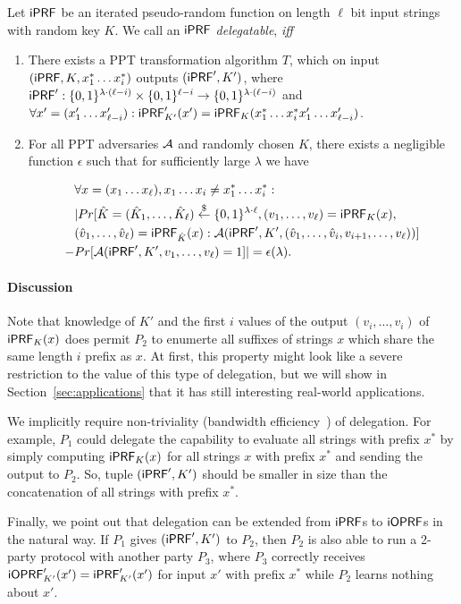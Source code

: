 \begin{definition} \label{def:del}
  Let $\mathsf{i}\mathsf{PRF}$ be an iterated pseudo-random function on length $\ell$
  bit input strings with random key $K$.  We call an $\mathsf{i}\mathsf{PRF}$
  \emph{delegatable}, \emph{iff}
  \begin{enumerate}
    \item
  There exists a PPT transformation
  algorithm $T$, which on input $(\mathsf{i}\mathsf{PRF},K,x^*_1\ldots{}x^*_i)$ outputs
  $(\mathsf{i}\mathsf{PRF}',K')$, where
  $\mathsf{i}\mathsf{PRF}':\{0,1\}^{\lambda\cdot(\ell-i)}\times\{0,1\}^{\ell-i}\rightarrow{}\{0,1\}^{\lambda\cdot(\ell-i)}$
  and
    $\forall{}x'=(x'_1\ldots{}x'_{\ell-i}):\mathsf{i}\mathsf{PRF}'_{K'}(x')=\mathsf{i}\mathsf{PRF}_{K}(x^*_1\ldots{}x^*_ix'_1\ldots{}x'_{\ell-i})$.
  \item For all PPT adversaries ${\mathcal{A}}$ and randomly chosen $K$,
    there exists a negligible function $\epsilon$ such that for
    sufficiently large $\lambda$ we have

    \begin{align*}
      &\forall{}x=(x_1\ldots{}x_\ell),x_1\ldots{}x_i\neq{}x^*_1\ldots{}x^*_i:\\&|Pr[\hat{K}=(\hat{K}_1,\ldots,\hat{K}_\ell)\stackrel{\$}{\leftarrow}\{0,1\}^{\lambda\cdot\ell},(v_1,\ldots,v_\ell)=\mathsf{i}\mathsf{PRF}_K(x),\\&(\hat{v}_1,\ldots,\hat{v}_\ell)=\mathsf{i}\mathsf{PRF}_{\hat{K}}(x):{\mathcal{A}}(\mathsf{i}\mathsf{PRF}',K',(\hat{v}_1,\ldots,\hat{v}_i,v_{i+1},\ldots,v_\ell))]\\-&Pr[{\mathcal{A}}(\mathsf{i}\mathsf{PRF}',K',v_1,\ldots,v_\ell)=1]|=\epsilon(\lambda).
\end{align*}
    \end{enumerate}
  \end{definition}

\paragraph{Discussion}

Note that knowledge of $K'$ and the first $i$ values of the output
$(v_i,\ldots,v_i)$ of $\mathsf{i}\mathsf{PRF}_K(x)$ does permit $P_2$ to enumerte all
suffixes of strings $x$ which share the same length $i$ prefix as
$x$. At first, this property might look like a severe restriction to
the value of this type of delegation, but we will show in
Section~\ref{sec:applications} that it has still interesting
real-world applications.

We implicitly require non-triviality (bandwidth
efficiency~\cite{delegate}) of delegation. For example, $P_1$ could
delegate the capability to evaluate all strings with prefix $x^*$ by
simply computing $\mathsf{i}\mathsf{PRF}_K(x)$ for all strings $x$ with prefix $x^*$
and sending the output to $P_2$. So, tuple $(\mathsf{i}\mathsf{PRF}',K')$ should be
smaller in size than the concatenation of all strings with prefix
$x^*$.

Finally, we point out that delegation can be extended from $\mathsf{i}\mathsf{PRF}$s to
$\mathsf{i}\mathsf{OPRF}$s in the natural way. If $P_1$ gives $(\mathsf{i}\mathsf{PRF}',K')$ to $P_2$,
then $P_2$ is also able to run a 2-party protocol with another party
$P_3$, where $P_3$ correctly receives
$\mathsf{i}\mathsf{OPRF}'_{K'}(x')=\mathsf{i}\mathsf{PRF}'_{K'}(x')$ for input $x'$ with prefix $x^*$
while $P_2$ learns nothing about $x'$.


